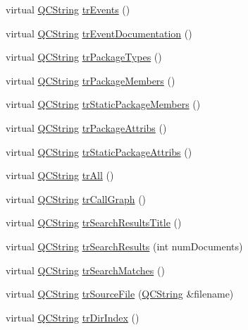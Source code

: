 \begin{DoxyCompactItemize}
virtual \hyperlink{class_q_c_string}{Q\+C\+String} \hyperlink{class_translator_chinese_ad562702b2a77d308bb44fcb408687d8e}{tr\+Events} ()
\item 
virtual \hyperlink{class_q_c_string}{Q\+C\+String} \hyperlink{class_translator_chinese_ad0bb3e2015b491a3a396e7a526588ae2}{tr\+Event\+Documentation} ()
\item 
virtual \hyperlink{class_q_c_string}{Q\+C\+String} \hyperlink{class_translator_chinese_a25cae2f1f4bdf463655080cff7c362ef}{tr\+Package\+Types} ()
\item 
virtual \hyperlink{class_q_c_string}{Q\+C\+String} \hyperlink{class_translator_chinese_ae085517b705f2b4a3f41259dc5fedcb1}{tr\+Package\+Members} ()
\item 
virtual \hyperlink{class_q_c_string}{Q\+C\+String} \hyperlink{class_translator_chinese_a1089b9469259c2a3fcfe04d961d9a3df}{tr\+Static\+Package\+Members} ()
\item 
virtual \hyperlink{class_q_c_string}{Q\+C\+String} \hyperlink{class_translator_chinese_a50804b5ad74925daac9ddeda1ae7a10c}{tr\+Package\+Attribs} ()
\item 
virtual \hyperlink{class_q_c_string}{Q\+C\+String} \hyperlink{class_translator_chinese_aa7d7f9013d65ef116d02a1f0432d970b}{tr\+Static\+Package\+Attribs} ()
\item 
virtual \hyperlink{class_q_c_string}{Q\+C\+String} \hyperlink{class_translator_chinese_afd2eb843c56e0fe445ca53aaaf839c89}{tr\+All} ()
\item 
virtual \hyperlink{class_q_c_string}{Q\+C\+String} \hyperlink{class_translator_chinese_a3172cf3eaa766ff2474ccd25cada88da}{tr\+Call\+Graph} ()
\item 
virtual \hyperlink{class_q_c_string}{Q\+C\+String} \hyperlink{class_translator_chinese_ac651391a9c3735b824c3f07817b06051}{tr\+Search\+Results\+Title} ()
\item 
virtual \hyperlink{class_q_c_string}{Q\+C\+String} \hyperlink{class_translator_chinese_ac6f51e7506b05f8f1622b4070a992545}{tr\+Search\+Results} (int num\+Documents)
\item 
virtual \hyperlink{class_q_c_string}{Q\+C\+String} \hyperlink{class_translator_chinese_a29ca693833cf41be5cfcbc0f3711ff65}{tr\+Search\+Matches} ()
\item 
virtual \hyperlink{class_q_c_string}{Q\+C\+String} \hyperlink{class_translator_chinese_ad5a765d26a7fe9bda8830f9641ab80eb}{tr\+Source\+File} (\hyperlink{class_q_c_string}{Q\+C\+String} \&filename)
\item 
virtual \hyperlink{class_q_c_string}{Q\+C\+String} \hyperlink{class_translator_chinese_a2ec4e8582f096292cd5c4314612bf84c}{tr\+Dir\+Index} ()

\end{DoxyCompactItemize}
